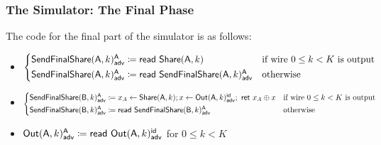 \subsubsection{The Simulator: The Final Phase}
The code for the final part of the simulator is as follows:

\begin{itemize}
\item {\color{blue} $\begin{cases*} \LeakSendFinalShare(\A,k)^\A_\adv \coloneqq \read{\Share(\A,k)} & \text{if wire $0 \leq k < K$ is output} \\ \LeakSendFinalShare(\A,k)^\A_\adv \coloneqq \read{\LeakSendFinalShare(\A,k)^\A_\adv} & \text{otherwise} \end{cases*}$}
\item {\color{blue} $\begin{cases*} \LeakSendFinalShare(\B,k)^\A_\adv \coloneqq x_A \leftarrow \Share(\A,k); x \leftarrow \LeakOut(\A,k)^\id_\adv; \ \ret{x_A \oplus x} & \text{if wire $0 \leq k < K$ is output} \\ \LeakSendFinalShare(\B,k)^\A_\adv \coloneqq \read{\LeakSendFinalShare(\B,k)^\A_\adv} & \text{otherwise} \end{cases*}$}
\item {\color{blue} $\mathsf{Out}(\mathsf{A},k)^{\mathsf{A}}_{\mathsf{adv}} \coloneqq \mathsf{read} \ \mathsf{Out}(\mathsf{A},k)^{\mathsf{id}}_{\mathsf{adv}}$ for $0 \leq k < K$}
\end{itemize}